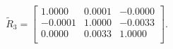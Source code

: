 \begin{equation*}
\widetilde{R}_{3} = 
\begin{bmatrix}
  1.0000 &   0.0001 &  -0.0000 \\
 -0.0001 &   1.0000 &  -0.0033 \\
  0.0000 &   0.0033 &   1.0000 \\
\end{bmatrix}.
\end{equation*}
